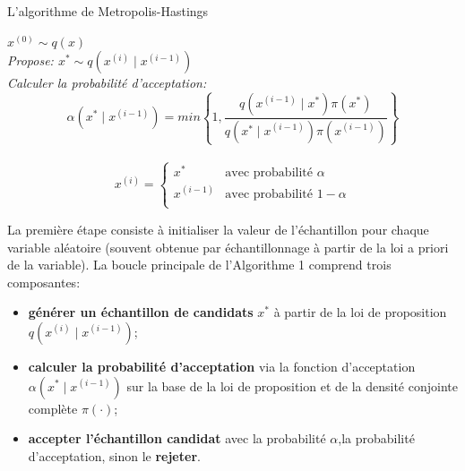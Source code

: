 \begin{algorithm}
\SetAlgoLined
\caption{L'algorithme de Metropolis-Hastings}
 $x^{(0)}\sim q(x)$ \\

\it{Propose: } $x^* \sim q(x^{(i)}\mid  x^{(i-1)})$ \\
\it{Calculer la probabilit\'e d'acceptation: } 
$$ \alpha(x^*\mid x^{(i-1)}) = min\left\{1, \frac{q(x^{(i-1)}\mid x^*)\pi(x^*)}{q(x^*\mid x^{(i-1)})\pi(x^{(i-1)})}\right\}$$ \\
\[
   x^{(i)} = 
    \begin{cases}
        x^* & \text{avec probabilit\'e $\alpha$} \\
        x^{(i-1)} & \text{avec probabilit\'e $1-\alpha$} \\
    \end{cases}
\]
\label{algorithmMH}
\end{algorithm}
\par \noindent La premi\`ere \'etape consiste \`a initialiser la valeur de l'\'echantillon pour chaque variable al\'eatoire (souvent obtenue par \'echantillonnage \`a partir de la loi a priori de la variable). La boucle principale de l'Algorithme 1 comprend trois composantes: 
\begin{itemize}[noitemsep]
	\item \textbf{g\'en\'erer un \'echantillon de candidats} $x^{*}$ \`a partir de la loi de proposition  $q(x^{(i)}\mid  x^{(i-1)})$;
	\item \textbf{calculer la probabilit\'e d'acceptation} via la fonction d'acceptation $\alpha(x^{*}\mid x^{(i-1)})$ sur la base de la loi de proposition et de la densit\'e conjointe compl\`ete  $\pi(\cdot)$;
	\item \textbf{accepter l'\'echantillon candidat} avec la probabilit\'e $\alpha$,la probabilit\'e d'acceptation, sinon le \textbf{rejeter}. 
\end{itemize}

